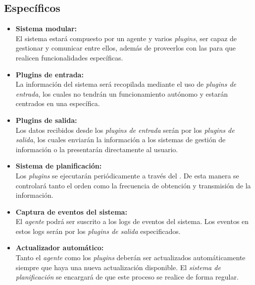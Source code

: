     \subsection{Específicos}
        \begin{itemize}
            \item \textbf{Sistema modular:} \\
                El sistema estará compuesto por un agente y varios \textit{plugins},  ser capaz de gestionar y comunicar entre ellos, además de proveerlos con las  para que realicen funcionalidades específicas.
                
            \item \textbf{Plugins de entrada:} \\
                La información del sistema será recopilada mediante el uso de \textit{plugins de entrada}, los cuales no tendrán un funcionamiento autónomo y estarán centrados en una  específica.
                
            \item \textbf{Plugins de salida:} \\
                Los datos recibidos desde los \textit{plugins de entrada} serán  por los \textit{plugins de salida}, los cuales enviarán la información a los sistemas de gestión de información  o la presentarán directamente al usuario.
                
            \item \textbf{Sistema de planificación:} \\
                Los \textit{plugins} se ejecutarán periódicamente a través del \textit{}. De esta manera se controlará tanto el orden como la frecuencia de obtención y transmisión de la información.
                  
            \item \textbf{Captura de eventos del sistema:} \\
                El \textit{agente} podrá ser suscrito a los logs de eventos del sistema. Los eventos  en estos logs serán  por los \textit{plugins de salida} especificados.
            
            \item \textbf{Actualizador automático:} \\
                Tanto el \textit{agente} como los \textit{plugins} deberán ser actualizados automáticamente siempre que haya una nueva actualización disponible. El \textit{sistema de planificación} se encargará de que este proceso se realice de forma regular.
                

\end{itemize}
